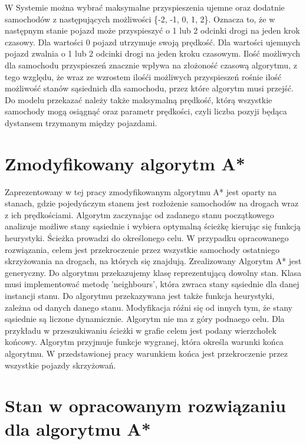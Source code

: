 \newline
\indent
W Systemie można wybrać maksymalne przyspieszenia ujemne oraz dodatnie samochodów z następujących możliwości \{-2, -1, 0, 1, 2\}. Oznacza to, że w następnym stanie pojazd może przyspieszyć o 1 lub 2 odcinki drogi na jeden krok czasowy. Dla wartości 0 pojazd utrzymuje swoją prędkość. Dla wartości ujemnych pojazd zwalnia o 1 lub 2 odcinki drogi na jeden kroku czasowym. Ilość możliwych dla samochodu przyspieszeń znacznie wpływa na złożoność czasową algorytmu, z tego względu, że wraz ze wzrostem ilośći możliwych przyspieszeń rośnie ilość możliwość stanów sąsiednich dla samochodu, przez które algorytm musi przejść.        
\newline
\indent
Do modelu przekazać należy także maksymalną prędkość, którą wszystkie samochody mogą osiągnąć oraz parametr prędkości, czyli liczba pozyji będąca dystansem trzymanym między pojazdami.

\section{Zmodyfikowany algorytm A*}

Zaprezentowany w tej pracy zmodyfikowanym algorytmu A* jest oparty na stanach, gdzie pojedyńczym stanem jest rozłożenie samochodów na drogach wraz z ich prędkościami. Algorytm zaczynając od zadanego stanu początkowego analizuje możliwe stany sąsiednie i wybiera optymalną ścieżkę kierując się funkcją heurystyki. Ścieżka prowadzi do określonego celu. W przypadku opracowanego rozwiązania, celem jest przekroczenie przez wszystkie samochody ostatniego skrzyżowania na drogach, na których się znajdują.
\newline
\indent
Zrealizowany Algorytm A* jest generyczny. Do algorytmu przekazujemy klasę reprezentującą dowolny stan. Klasa musi implementować metodę 'neighbours', która zwraca stany sąsiednie dla danej instancji stanu. Do algorytmu przekazywana jest także funkcja heurystyki, zależna od danych danego stanu.
\newline
\indent
Modyfikacja róźni się od innych tym, że stany sąsiednie są liczone dynamicznie. Algorytm nie ma z góry podnaego celu. Dla przykładu w przeszukiwaniu ścieżki w grafie celem jest podany wierzchołek końcowy. Algorytm przyjmuje funkcje wygranej, która określa warunki końca algorytmu. W przedstawionej pracy warunkiem końca jest przekroczenie przez wszystkie pojazdy skrzyżowań.

\section{Stan w opracowanym rozwiązaniu dla algorytmu A*}

